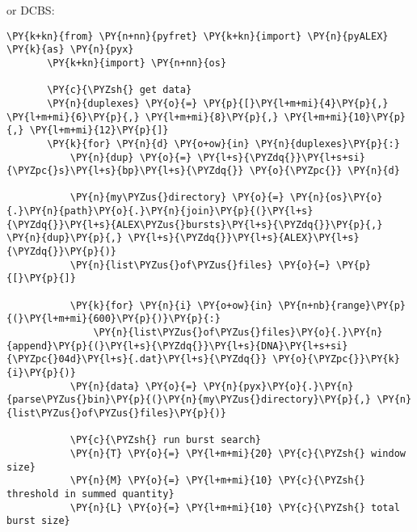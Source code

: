 or DCBS:

\begin{Verbatim}[commandchars=\\\{\}, fontsize=\scriptsize]
\PY{k+kn}{from} \PY{n+nn}{pyfret} \PY{k+kn}{import} \PY{n}{pyALEX} \PY{k}{as} \PY{n}{pyx}
       \PY{k+kn}{import} \PY{n+nn}{os}
       
       \PY{c}{\PYZsh{} get data}
       \PY{n}{duplexes} \PY{o}{=} \PY{p}{[}\PY{l+m+mi}{4}\PY{p}{,} \PY{l+m+mi}{6}\PY{p}{,} \PY{l+m+mi}{8}\PY{p}{,} \PY{l+m+mi}{10}\PY{p}{,} \PY{l+m+mi}{12}\PY{p}{]}
       \PY{k}{for} \PY{n}{d} \PY{o+ow}{in} \PY{n}{duplexes}\PY{p}{:}
           \PY{n}{dup} \PY{o}{=} \PY{l+s}{\PYZdq{}}\PY{l+s+si}{\PYZpc{}s}\PY{l+s}{bp}\PY{l+s}{\PYZdq{}} \PY{o}{\PYZpc{}} \PY{n}{d}
       
           \PY{n}{my\PYZus{}directory} \PY{o}{=} \PY{n}{os}\PY{o}{.}\PY{n}{path}\PY{o}{.}\PY{n}{join}\PY{p}{(}\PY{l+s}{\PYZdq{}}\PY{l+s}{ALEX\PYZus{}bursts}\PY{l+s}{\PYZdq{}}\PY{p}{,} \PY{n}{dup}\PY{p}{,} \PY{l+s}{\PYZdq{}}\PY{l+s}{ALEX}\PY{l+s}{\PYZdq{}}\PY{p}{)}
           \PY{n}{list\PYZus{}of\PYZus{}files} \PY{o}{=} \PY{p}{[}\PY{p}{]}
           
           \PY{k}{for} \PY{n}{i} \PY{o+ow}{in} \PY{n+nb}{range}\PY{p}{(}\PY{l+m+mi}{600}\PY{p}{)}\PY{p}{:}
               \PY{n}{list\PYZus{}of\PYZus{}files}\PY{o}{.}\PY{n}{append}\PY{p}{(}\PY{l+s}{\PYZdq{}}\PY{l+s}{DNA}\PY{l+s+si}{\PYZpc{}04d}\PY{l+s}{.dat}\PY{l+s}{\PYZdq{}} \PY{o}{\PYZpc{}}\PY{k}{i}\PY{p}{)}
           \PY{n}{data} \PY{o}{=} \PY{n}{pyx}\PY{o}{.}\PY{n}{parse\PYZus{}bin}\PY{p}{(}\PY{n}{my\PYZus{}directory}\PY{p}{,} \PY{n}{list\PYZus{}of\PYZus{}files}\PY{p}{)}
       
           \PY{c}{\PYZsh{} run burst search}
           \PY{n}{T} \PY{o}{=} \PY{l+m+mi}{20} \PY{c}{\PYZsh{} window size}
           \PY{n}{M} \PY{o}{=} \PY{l+m+mi}{10} \PY{c}{\PYZsh{} threshold in summed quantity}
           \PY{n}{L} \PY{o}{=} \PY{l+m+mi}{10} \PY{c}{\PYZsh{} total burst size}
       

\end{Verbatim}
